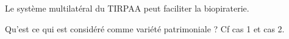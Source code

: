 \begin{frame}

Le système multilatéral du TIRPAA peut faciliter la biopiraterie. 

\vfill

\begin{block}{}
\centering
Qu'est ce qui est considéré comme variété patrimoniale ? Cf cas 1 et cas 2.
\end{block}

%
%

\end{frame}



